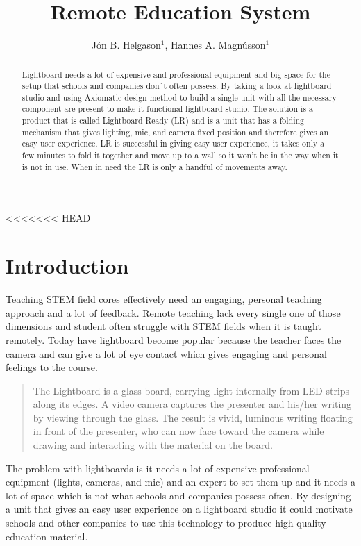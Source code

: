 \documentclass[a4paper]{jpconf}
\begin{document}
<<<<<<< HEAD
	\title{Remote Education System}
	
	\author{ J\'on B. Helgason$^{1}$, Hannes A. Magnússon$^{1}$}
	
	\address{$^{1}$Reykjavik University, Menntavegur 1, Reykjavik 102, Iceland}
	
	
	\begin{abstract}
		Lightboard needs a lot of expensive and professional equipment and big space for the setup that schools and companies don´t often possess.
		By taking a look at lightboard studio and using Axiomatic design method to build a single unit with all the necessary component are present to make it functional lightboard studio.
		The solution is a product that is called Lightboard Ready (LR) and is a unit that has a folding mechanism that gives lighting, mic, and camera fixed position and therefore gives an easy user experience.
		LR is successful in giving easy user experience, it takes only a few minutes to fold it together and move up to a wall so it won't be in the way when it is not in use. When in need the LR is only a handful of movements away.
	\end{abstract}
	
	
	
	\section{Introduction}
	Teaching STEM field cores effectively need an engaging, personal teaching approach and a lot of feedback. Remote teaching lack every single one of those dimensions and student often struggle with STEM fields when it is taught remotely. Today have lightboard become popular because the teacher faces the camera and can give a lot of eye contact which gives engaging and personal feelings to the course. 
	\begin{quote}
		The Lightboard is a glass board, carrying light internally from LED strips along its edges. A video camera captures the presenter and his/her writing by viewing through the glass. The result is vivid, luminous writing floating in front of the presenter, who can now face toward the camera while drawing and interacting with the material on the board.\cite{birdwell2015capturing}
	\end{quote}
	The problem with lightboards is it needs a lot of expensive professional equipment (lights, cameras, and mic) and an expert to set them up and it needs a lot of space which is not what schools and companies possess often. 
	By designing a unit that gives an easy user experience on a lightboard studio it could motivate schools and other companies to use this technology to produce high-quality education material.
	
\end{document}
